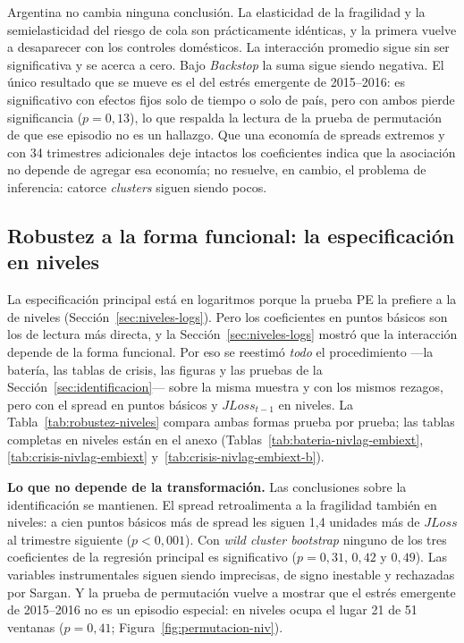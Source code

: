 Argentina no cambia ninguna conclusión. La elasticidad de la fragilidad y la semielasticidad del riesgo de cola son prácticamente idénticas, y la primera vuelve a desaparecer con los controles domésticos. La interacción promedio sigue sin ser significativa y se acerca a cero. Bajo \textit{Backstop} la suma sigue siendo negativa. El único resultado que se mueve es el del estrés emergente de 2015--2016: es significativo con efectos fijos solo de tiempo o solo de país, pero con ambos pierde significancia ($p=0{,}13$), lo que respalda la lectura de la prueba de permutación de que ese episodio no es un hallazgo. Que una economía de spreads extremos y con 34 trimestres adicionales deje intactos los coeficientes indica que la asociación no depende de agregar esa economía; no resuelve, en cambio, el problema de inferencia: catorce \textit{clusters} siguen siendo pocos.

\subsection{Robustez a la forma funcional: la especificación en niveles}
\label{sec:robustez-niveles}

La especificación principal está en logaritmos porque la prueba PE la prefiere a la de niveles (Sección~\ref{sec:niveles-logs}). Pero los coeficientes en puntos básicos son los de lectura más directa, y la Sección~\ref{sec:niveles-logs} mostró que la interacción depende de la forma funcional. Por eso se reestimó \emph{todo} el procedimiento ---la batería, las tablas de crisis, las figuras y las pruebas de la Sección~\ref{sec:identificacion}--- sobre la misma muestra y con los mismos rezagos, pero con el spread en puntos básicos y $JLoss_{t-1}$ en niveles. La Tabla~\ref{tab:robustez-niveles} compara ambas formas prueba por prueba; las tablas completas en niveles están en el anexo (Tablas~\ref{tab:bateria-nivlag-embiext}, \ref{tab:crisis-nivlag-embiext} y~\ref{tab:crisis-nivlag-embiext-b}).



\textbf{Lo que no depende de la transformación.} Las conclusiones sobre la identificación se mantienen. El spread retroalimenta a la fragilidad también en niveles: a cien puntos básicos más de spread les siguen 1,4 unidades más de $JLoss$ al trimestre siguiente ($p<0{,}001$). Con \textit{wild cluster bootstrap} ninguno de los tres coeficientes de la regresión principal es significativo ($p=0{,}31$, $0{,}42$ y $0{,}49$). Las variables instrumentales siguen siendo imprecisas, de signo inestable y rechazadas por Sargan. Y la prueba de permutación vuelve a mostrar que el estrés emergente de 2015--2016 no es un episodio especial: en niveles ocupa el lugar 21 de 51 ventanas ($p=0{,}41$; Figura~\ref{fig:permutacion-niv}).

